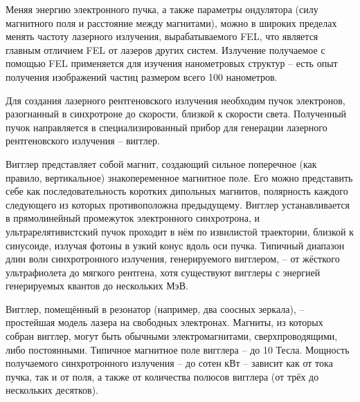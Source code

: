 Меняя энергию электронного пучка, а также параметры ондулятора (силу магнитного поля 
и расстояние между магнитами), можно в широких пределах менять частоту лазерного 
излучения, вырабатываемого FEL, что является главным отличием FEL от лазеров других 
систем. Излучение получаемое с помощью FEL применяется для изучения нанометровых 
структур -- есть опыт получения изображений частиц размером всего 100 нанометров. 

Для создания лазерного рентгеновского излучения необходим пучок электронов, 
разогнанный в синхротроне до скорости, близкой к скорости света. Полученный пучок 
направляется в специализированный прибор для генерации лазерного рентгеновского 
излучения -- вигглер.

Вигглер представляет собой магнит, создающий сильное поперечное (как правило, 
вертикальное) знакопеременное магнитное поле. Его можно представить себе как 
последовательность коротких дипольных магнитов, полярность каждого следующего из 
которых противоположна предыдущему. Вигглер устанавливается в прямолинейный 
промежуток электронного синхротрона, и ультрарелятивистский пучок проходит в нём по 
извилистой траектории, близкой к синусоиде, излучая фотоны в узкий конус вдоль оси 
пучка. Типичный диапазон длин волн синхротронного излучения, генерируемого 
вигглером, -- от жёсткого ультрафиолета до мягкого рентгена, хотя существуют 
вигглеры с энергией генерируемых квантов до нескольких МэВ.

Вигглер, помещённый в резонатор (например, два соосных зеркала), -- простейшая 
модель лазера на свободных электронах. Магниты, из которых собран вигглер, могут 
быть обычными электромагнитами, сверхпроводящими, либо постоянными. Типичное 
магнитное поле вигглера -- до 10 Тесла. Мощность получаемого синхротронного 
излучения -- до сотен кВт -- зависит как от тока пучка, так и от поля, а также от 
количества полюсов вигглера (от трёх до нескольких десятков).

